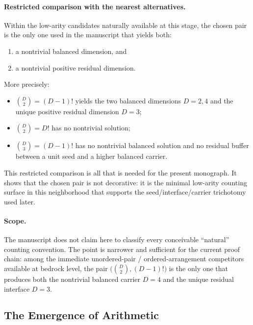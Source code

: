 \paragraph{Restricted comparison with the nearest alternatives.}
Within the low-arity candidates naturally available at this stage, the chosen
pair is the only one used in the manuscript that yields both:
\begin{enumerate}[label=(\roman*), itemsep=0.2em]
\item a nontrivial balanced dimension, and
\item a nontrivial positive residual dimension.
\end{enumerate}
More precisely:
\begin{itemize}[itemsep=0.2em]
\item \(\binom{D}{2}=(D-1)!\) yields the two balanced dimensions \(D=2,4\) and
      the unique positive residual dimension \(D=3\);
\item \(\binom{D}{2}=D!\) has no nontrivial solution;
\item \(\binom{D}{3}=(D-1)!\) has no nontrivial balanced solution and no
      residual buffer between a unit seed and a higher balanced carrier.
\end{itemize}
This restricted comparison is all that is needed for the present monograph.
It shows that the chosen pair is not decorative: it is the minimal low-arity
counting surface in this neighborhood that supports the seed/interface/carrier
trichotomy used later.

\paragraph{Scope.}
The manuscript does not claim here to classify every conceivable
``natural'' counting convention. The point is narrower and sufficient for the
current proof chain: among the immediate unordered-pair / ordered-arrangement
competitors available at bedrock level, the pair
\(\bigl(\binom{D}{2},(D-1)!\bigr)\) is the only one that produces both the
nontrivial balanced carrier \(D=4\) and the unique residual interface \(D=3\).

\subsection{The Emergence of Arithmetic}
\label{subsec:emergence-arithmetic}

